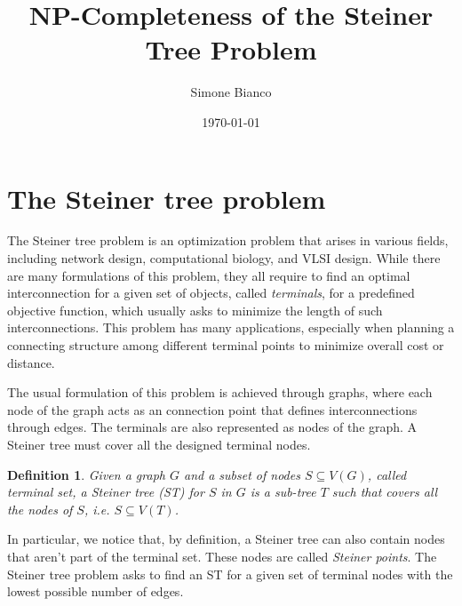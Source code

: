 \documentclass[12pt,a4paper]{article}
\newtheorem{definition}{Definition}
\begin{document}
    \title{NP-Completeness of the Steiner Tree Problem}
    \author{Simone Bianco}
    \date{\today}

    \maketitle


    \tableofcontents
    \newpage

    \section{The Steiner tree problem}

    The Steiner tree problem is an optimization problem that arises in various fields, including network design, computational biology, and VLSI design. While there are many formulations of this problem, they all require to find an optimal interconnection for a given set of objects, called \textit{terminals}, for a predefined objective function, which usually asks to minimize the length of such interconnections. This problem has many applications, especially when planning a connecting structure among different terminal points to minimize overall cost or distance. \cite{shortest_network}
    
    The usual formulation of this problem is achieved through graphs, where each node of the graph acts as an connection point that defines interconnections through edges. The terminals are also represented as nodes of the graph. A Steiner tree must cover all the designed terminal nodes.
    
    \begin{definition}
        Given a graph $G$ and a subset of nodes $S \subseteq V(G)$, called \textit{terminal set}, a Steiner tree (ST) for $S$ in $G$ is a sub-tree $T$ such that covers all the nodes of $S$, i.e. $S \subseteq V(T)$.
    \end{definition}

    In particular, we notice that, by definition, a Steiner tree can also contain nodes that aren't part of the terminal set. These nodes are called \textit{Steiner points}. The Steiner tree problem asks to find an ST for a given set of terminal nodes with the lowest possible number of edges.
\end{document}
